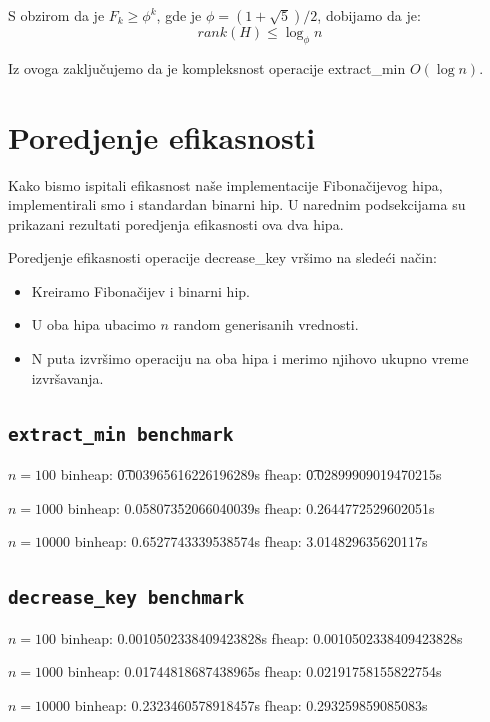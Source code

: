 \documentclass[a4paper]{article}
\theoremstyle{plain}
\theoremstyle{definition}
\begin{document}
S obzirom da je $F_{k} \geq \phi^{k}$, gde je $\phi = (1 + \sqrt{5}) / 2$, dobijamo da je:
$$rank(H) \leq \log_{\phi}{n} $$

Iz ovoga zaklju\v{c}ujemo da je kompleksnost operacije extract_min $O(\log{n})$.

\section{Poredjenje efikasnosti}
\label{sec:Exp}
Kako bismo ispitali efikasnost na\v{s}e implementacije Fibona\v{c}ijevog hipa, implementirali smo i standardan binarni hip. U narednim podsekcijama su prikazani rezultati poredjenja efikasnosti ova dva hipa.

Poredjenje efikasnosti operacije decrease_key vr\v{s}imo na slede\'{c}i na\v{c}in:
\begin{itemize}
    \item Kreiramo Fibona\v{c}ijev i binarni hip.
    \item U oba hipa ubacimo $n$ random generisanih vrednosti.
    \item N puta izvr\v{s}imo operaciju na oba hipa i merimo njihovo ukupno vreme izvr\v{s}avanja.
\end{itemize}

\subsection{\texttt{extract_min benchmark}}
\label{subsec:ExpExtractMin}
$n = 100$
binheap: \t0.003965616226196289s
fheap: \t0.02899909019470215s

$n = 1000$
binheap: 0.05807352066040039s
fheap: 0.2644772529602051s

$n = 10000$
binheap: 0.6527743339538574s
fheap: 3.014829635620117s

\subsection{\texttt{decrease_key benchmark}}
\label{subsec:ExpDecreaseKey}
$n = 100$
binheap: 0.0010502338409423828s
fheap: 0.0010502338409423828s

$n = 1000$
binheap: 0.01744818687438965s
fheap: 0.02191758155822754s

$n = 10000$
binheap: 0.2323460578918457s
fheap: 0.293259859085083s

\appendix



\end{document}
